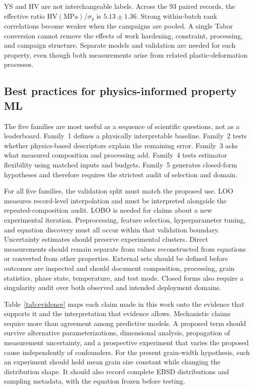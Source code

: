 \documentclass[5p,times,twocolumn]{elsarticle}
\begin{document}
YS and HV are not interchangeable labels. Across the 93 paired records, the effective ratio $\mathrm{HV(MPa)}/\sigma_y$ is $5.13\pm1.36$. Strong within-batch rank correlations become weaker when the campaigns are pooled. A single Tabor conversion cannot remove the effects of work hardening, constraint, processing, and campaign structure. Separate models and validation are needed for each property, even though both measurements arise from related plastic-deformation processes.

\subsection{Best practices for physics-informed property ML}

The five families are most useful as a sequence of scientific questions, not as a leaderboard. Family~1 defines a physically interpretable baseline. Family~2 tests whether physics-based descriptors explain the remaining error. Family~3 asks what measured composition and processing add. Family~4 tests estimator flexibility using matched inputs and budgets. Family~5 generates closed-form hypotheses and therefore requires the strictest audit of selection and domain.

For all five families, the validation split must match the proposed use. LOO measures record-level interpolation and must be interpreted alongside the repeated-composition audit. LOBO is needed for claims about a new experimental iteration. Preprocessing, feature selection, hyperparameter tuning, and equation discovery must all occur within that validation boundary. Uncertainty estimates should preserve experimental clusters. Direct measurements should remain separate from values reconstructed from equations or converted from other properties. External sets should be defined before outcomes are inspected and should document composition, processing, grain statistics, phase state, temperature, and test mode. Closed forms also require a singularity audit over both observed and intended deployment domains.

Table~\ref{tab:evidence} maps each claim made in this work onto the evidence that supports it and the interpretation that evidence allows. Mechanistic claims require more than agreement among predictive models. A proposed term should survive alternative parameterizations, dimensional analysis, propagation of measurement uncertainty, and a prospective experiment that varies the proposed cause independently of confounders. For the present grain-width hypothesis, such an experiment should hold mean grain size constant while changing the distribution shape. It should also record complete EBSD distributions and sampling metadata, with the equation frozen before testing.
\end{document}
